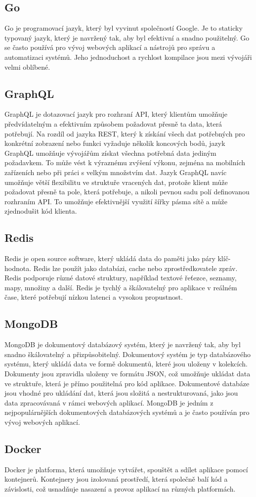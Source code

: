 \subsection{Go}
Go je programovací jazyk, který byl vyvinut společností Google. Je to staticky typovaný jazyk, který je navržený tak, aby byl efektivní a snadno použitelný. Go se často používá pro vývoj webových aplikací a nástrojů pro správu a automatizaci systémů. Jeho jednoduchost a rychlost kompilace jsou mezi vývojáři velmi oblíbené.

\subsection{GraphQL}
GraphQL je dotazovací jazyk pro rozhraní API, který klientům umožňuje předvídatelným a efektivním způsobem požadovat přesně ta data, která potřebují. Na rozdíl od jazyka REST, který k získání všech dat potřebných pro konkrétní zobrazení nebo funkci vyžaduje několik koncových bodů, jazyk GraphQL umožňuje vývojářům získat všechna potřebná data jediným požadavkem. To může vést k výraznému zvýšení výkonu, zejména na mobilních zařízeních nebo při práci s velkým množstvím dat. Jazyk GraphQL navíc umožňuje větší flexibilitu ve struktuře vracených dat, protože klient může požadovat přesně ta pole, která potřebuje, a nikoli pevnou sadu polí definovanou rozhraním API. To umožňuje efektivnější využití šířky pásma sítě a může zjednodušit kód klienta.
\subsection{Redis}
Redis je open source software, který ukládá data do paměti jako páry klíč-hodnota. Redis lze použít jako databázi, cache nebo zprostředkovatele zpráv. Redis podporuje různé datové struktury, například textové řeťezce, seznamy, mapy, množiny a další. Redis je tychlý a škálovatelný pro aplikace v reálném čase, které potřebují nízkou latenci a vysokou propustnost.

\subsection{MongoDB}
MongoDB je dokumentový databázový systém, který je navržený tak, aby byl snadno škálovatelný a přizpůsobitelný. Dokumentový systém je typ databázového systému, který ukládá data ve formě dokumentů, které jsou uloženy v kolekcích. Dokumenty jsou zpravidla uloženy ve formátu JSON, což umožňuje ukládat data ve struktuře, která je přímo použitelná pro kód aplikace. Dokumentové databáze jsou vhodné pro ukládání dat, která jsou složitá a nestrukturovaná, jako jsou data zpracovávaná v rámci webových aplikací. MongoDB je jedním z nejpopulárnějších dokumentových databázových systémů a je často používán pro vývoj webových aplikací.

\subsection{Docker}
Docker je platforma, která umožňuje vytvářet, spouštět a sdílet aplikace pomocí kontejnerů. Kontejnery jsou izolovaná prostředí, která společně balí kód a závislosti, což usnadňuje nasazení a provoz aplikací na různých platformách.
